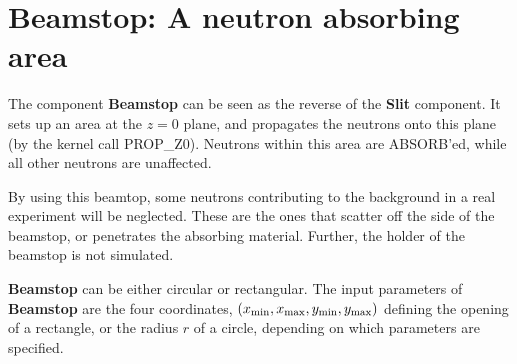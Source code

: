 \section{Beamstop: A neutron absorbing area}
\label{beamstop}


The component {\bf Beamstop} can be seen as the reverse of 
the {\bf Slit} component.
It sets up an area at the $z=0$ plane, and propagates the neutrons 
onto this plane (by the kernel call PROP\_Z0).
Neutrons within this area are ABSORB'ed, 
while all other neutrons are unaffected.

By using this beamtop, some neutrons contributing to the background
in a real experiment will be neglected. 
These are the ones that scatter off the side
of the beamstop, or penetrates the absorbing material.
Further, the holder of the beamstop is not simulated.

{\bf Beamstop} can be either circular or rectangular.
The input parameters of {\bf Beamstop} are the four coordinates,
$(x_{\rm min}, x_{\rm max}, y_{\rm min}, y_{\rm max})$
defining the opening of a rectangle, or the radius $r$ of 
a circle, depending on which parameters are specified.
